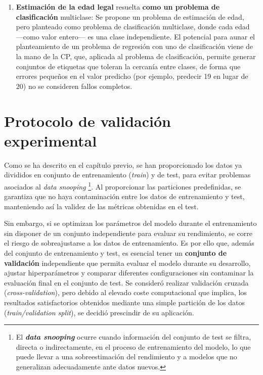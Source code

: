 \begin{enumerate}
    \item \textbf{Estimación de la edad legal} resuelta \textbf{como un problema de clasificación} multiclase: Se propone un problema de estimación de edad, pero planteado como problema de clasificación multiclase, donde cada edad ---como valor entero--- es una clase independiente. El potencial para aunar el planteamiento de un problema de regresión con uno de clasificación viene de la mano de la \acrshort{CP}, que, aplicada al problema de clasificación, permite generar conjuntos de etiquetas que toleran la cercanía entre clases, de forma que errores pequeños en el valor predicho (por ejemplo, predecir 19 en lugar de 20) no se consideren fallos completos.

\end{enumerate}


\section{Protocolo de validación experimental}

Como se ha descrito en el capítulo previo, se han proporcionado los datos ya divididos en conjunto de entrenamiento (\textit{train}) y de test, para evitar problemas asociados al \textit{data snooping}%
\footnote{
    El \textbf{\textit{data snooping}} ocurre cuando información del conjunto de test se filtra, directa o indirectamente, en el proceso de entrenamiento del modelo, lo que puede llevar a una sobreestimación del rendimiento y a modelos que no generalizan adecuadamente ante datos nuevos.
}.
Al proporcionar las particiones predefinidas, se garantiza que no haya contaminación entre los datos de entrenamiento y test, manteniendo así la validez de las métricas obtenidas en el test. 

Sin embargo, si se optimizan los parámetros del modelo durante el entrenamiento sin disponer de un conjunto independiente para evaluar su rendimiento, se corre el riesgo de sobreajustarse a los datos de entrenamiento. Es por ello que, además del conjunto de entrenamiento y test, es esencial tener un \textbf{conjunto de validación} independiente que permita evaluar el modelo durante su desarrollo, ajustar hiperparámetros y comparar diferentes configuraciones sin contaminar la evaluación final en el conjunto de test. Se consideró realizar validación cruzada (\textit{cross-validation}), pero debido al elevado coste computacional que implica, los resultados satisfactorios obtenidos mediante una simple partición de los datos (\textit{train/validation split}), se decidió prescindir de su aplicación.

